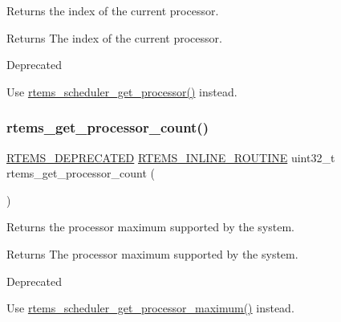 Returns the index of the current processor. 

\begin{DoxyReturn}{Returns}
The index of the current processor.
\end{DoxyReturn}
\begin{DoxyRefDesc}{Deprecated}
\item[\mbox{\hyperlink{deprecated__deprecated000011}{Deprecated}}]\end{DoxyRefDesc}


Use \mbox{\hyperlink{group__ClassicTasks_gac7891d8a0bfe04de75c7c9e89f174cab}{rtems\+\_\+scheduler\+\_\+get\+\_\+processor()}} instead. \mbox{\label{group__ClassicTasks_ga055c5c7a9106ddce18326a347e77e1ee}} 
\subsubsection{\texorpdfstring{rtems\_get\_processor\_count()}{rtems\_get\_processor\_count()}}
{\footnotesize\ttfamily \mbox{\hyperlink{group__RTEMSScoreBaseDefs_gab651a076d4d51d50221e7ef7ac99d4e7}{R\+T\+E\+M\+S\+\_\+\+D\+E\+P\+R\+E\+C\+A\+T\+ED}} \mbox{\hyperlink{group__RTEMSScoreBaseDefs_gac216239df231d5dbd15e3520b0b9313f}{R\+T\+E\+M\+S\+\_\+\+I\+N\+L\+I\+N\+E\+\_\+\+R\+O\+U\+T\+I\+NE}} uint32\+\_\+t rtems\+\_\+get\+\_\+processor\+\_\+count (\begin{DoxyParamCaption}\item[{void}]{ }\end{DoxyParamCaption})}



Returns the processor maximum supported by the system. 

\begin{DoxyReturn}{Returns}
The processor maximum supported by the system.
\end{DoxyReturn}
\begin{DoxyRefDesc}{Deprecated}
\item[\mbox{\hyperlink{deprecated__deprecated000012}{Deprecated}}]\end{DoxyRefDesc}


Use \mbox{\hyperlink{group__ClassicTasks_ga3bfd90bb42ab219bc15b7b97ffc596b9}{rtems\+\_\+scheduler\+\_\+get\+\_\+processor\+\_\+maximum()}} instead. \mbox{\label{group__ClassicTasks_ga3dcba5bc6f402c4fa35f0dc91dd1e3fd}} 
